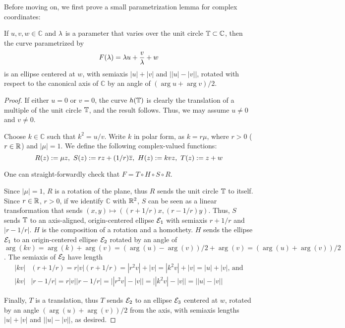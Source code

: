  
Before moving on, we first prove a small parametrization lemma for complex coordinates:

\begin{lemma}
If $u,v,w\in\mathbb{C}$ and $\lambda$ is a parameter that varies over the unit circle $\mathbb{T}\subset\mathbb{C}$, then the curve parametrized by
\[ F(\lambda)=  \lambda u+ \frac{v}{\lambda}+w \]
is an ellipse centered at $w$, with semiaxis $|u|+|v|$ and $\big||u|-|v|\big|$, rotated with respect to the canonical axis of $\mathbb{C}$ by an angle of $(\arg u+\arg v)/2$.
\label{lem:ell-param}
\end{lemma}

\begin{proof}
If either $u=0$ or $v=0$, the curve $h(\mathbb{T})$ is clearly the translation of a multiple of the unit circle $\mathbb{T}$, and the result follows. Thus, we may assume $u\neq 0$ and $v\neq 0$.

Choose $k\in\mathbb{C}$ such that $k^2=u/v$. Write $k$ in polar form, as $k=r \mu$, where $r>0$ ($r\in\mathbb{R}$) and $|\mu|=1$. We define the following complex-valued functions:
\[R(z):=\mu z,~ S(z):=r z+(1/r) \overline{z},~ H(z):=k v z,~ T(z):=z+w\]

One can straight-forwardly check that $F=T\circ H\circ S\circ R$.

Since $|\mu|=1$, $R$ is a rotation of the plane, thus $R$ sends the unit circle $\mathbb{T}$ to itself. Since $r\in\mathbb{R}$, $r>0$, if we identify $\mathbb{C}$ with $\mathbb{R}^2$, $S$ can be seen as a linear transformation that sends $(x,y)\mapsto\left(\left(r+1/r\right)x,\left(r-1/r\right)y\right)$. Thus, $S$ sends $\mathbb{T}$ to an axis-aligned, origin-centered ellipse $\mathcal{E}_1$ with semiaxis $r+1/r$ and $|r-1/r|$. $H$ is the composition of a rotation and a homothety. $H$ sends the ellipse $\mathcal{E}_1$ to an origin-centered ellipse $\mathcal{E}_2$ rotated by an angle of $\arg(k v)=\arg(k)+\arg(v)=(\arg(u)-\arg(v))/2+\arg(v)=(\arg(u)+\arg(v))/2$. The semiaxis of $\mathcal{E}_2$ have length
\begin{align*}
|k v|&(r+1/r)=r|v|(r+1/r)=|r^2 v|+|v|=|k^2 v|+|v|=|u|+|v|\text{, and}\\
|k v|&|r-1/r|=r|v||r-1/r|=\big||r^2 v|-|v|\big|=\big||k^2 v|-|v|\big|=\big||u|-|v|\big|
\end{align*}

Finally, $T$ is a translation, thus $T$ sends $\mathcal{E}_2$ to an ellipse $\mathcal{E}_3$ centered at $w$, rotated by an angle $(\arg(u)+\arg(v))/2$ from the axis, with semiaxis lengths $|u|+|v|$ and $\big||u|-|v|\big|$, as desired.
\end{proof}

